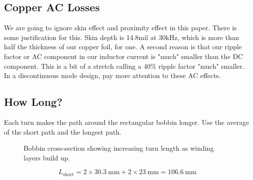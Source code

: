 \documentclass{article}
\begin{document}
\subsection{Copper AC Losses}
We are going to ignore skin effect and proximity effect in this paper.  There is some justification for this.  Skin depth is 14.8mil at 30kHz, which is more than half the thickness of our copper foil, for one.  A second reason is that our ripple factor or AC component in our inductor current is "much" smaller than the DC component.  This is a bit of a stretch calling a 40\% ripple factor "much" smaller.  In a discontinuous mode design, pay more attention to these AC effects.

\subsection{How Long?}
Each turn makes the path around the rectangular bobbin longer.
Use the average of the short path and the longest path. \\

\begin{figure}[H]
    \centering
    \caption{Bobbin cross-section showing increasing turn length as winding layers build up.}
    \label{fig:bobbin_turns}
\end{figure}

\begin{equation}
    L_{\text{short}} = 2 \times \SI{30.3}{\milli\meter} + 2 \times \SI{23}{\milli\meter} = \SI{106.6}{\milli\meter}
\end{equation}
\end{document}
